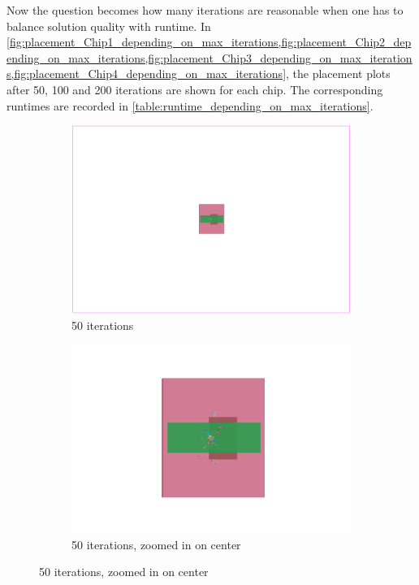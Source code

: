 Now the question becomes how many iterations are reasonable when one has to balance solution quality with runtime.
In 
\cref{fig:placement_Chip1_depending_on_max_iterations,fig:placement_Chip2_depending_on_max_iterations,fig:placement_Chip3_depending_on_max_iterations,fig:placement_Chip4_depending_on_max_iterations},
the placement plots after 50, 100 and 200 iterations are shown for each chip.
The corresponding runtimes are recorded in \cref{table:runtime_depending_on_max_iterations}.

\begin{figure}[p]
 \centering

 \begin{subfigure}{.48\textwidth}
  \includegraphics[width=\textwidth]{epsilon/placement_Chip1_50_iterations.png}
  \caption{50 iterations}
 \end{subfigure}
 \hfill
 \begin{subfigure}{.48\textwidth}
  \includegraphics[width=\textwidth, frame]{epsilon/placement_Chip1_50_iterations_zoomed.png}
  \caption{50 iterations, zoomed in on center}
 \end{subfigure}
 

\end{figure}
